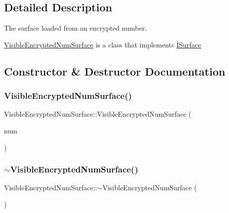 \subsection{Detailed Description}
The surface loaded from an encrypted number. 

\mbox{\hyperlink{class_visible_encrypted_num_surface}{Visible\+Encrypted\+Num\+Surface}} is a class that implements \mbox{\hyperlink{class_i_surface}{I\+Surface}} 

\subsection{Constructor \& Destructor Documentation}
\mbox{\label{class_visible_encrypted_num_surface_aaee46834915f1c0463eac6e8a6f50369}} 
\subsubsection{\texorpdfstring{Visible\+Encrypted\+Num\+Surface()}{VisibleEncryptedNumSurface()}}
{\footnotesize\ttfamily Visible\+Encrypted\+Num\+Surface\+::\+Visible\+Encrypted\+Num\+Surface (\begin{DoxyParamCaption}\item[{const \mbox{\hyperlink{class_visible_encrypted_num}{Visible\+Encrypted\+Num}} \&}]{num }\end{DoxyParamCaption})}

\mbox{\label{class_visible_encrypted_num_surface_affe295bd756072b3b8664f763d5ab2ab}} 
\subsubsection{\texorpdfstring{$\sim$\+Visible\+Encrypted\+Num\+Surface()}{~VisibleEncryptedNumSurface()}}
{\footnotesize\ttfamily Visible\+Encrypted\+Num\+Surface\+::$\sim$\+Visible\+Encrypted\+Num\+Surface (\begin{DoxyParamCaption}{ }\end{DoxyParamCaption})\hspace{0.3cm}{\ttfamily [virtual]}}



